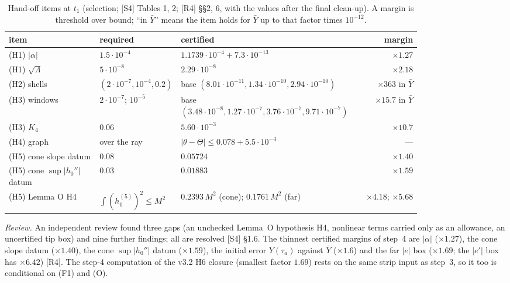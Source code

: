 \documentclass[11pt]{amsart}
\theoremstyle{definition}
\theoremstyle{remark}
\newcommand{\Lam}{\Lambda}
\newcommand{\dref}[1]{[\textsf{#1}]}
\begin{document}
\begin{table}[htbp]\centering\small
\caption{Hand-off items at $t_1$ (selection; \dref{S4} Tables 1, 2; \dref{R4} \S\S2, 6, with the values after the final clean-up). A margin is threshold over bound; ``in $\bar Y$'' means the item holds for $\bar Y$ up to that factor times $10^{-12}$.}\label{tab:handoff}
\footnotesize
\begin{tabular}{@{}p{0.22\linewidth}p{0.19\linewidth}p{0.41\linewidth}r@{}}\toprule
item & required & certified & margin\\\midrule
(H1) $|\alpha|$ & $1.5\cdot10^{-4}$ & $1.1739\cdot10^{-4}+7.3\cdot10^{-13}$ & $\times1.27$\\
(H1) $\sqrt\Lam$ & $5\cdot10^{-8}$ & $2.29\cdot10^{-8}$ & $\times2.18$\\
(H2) shells & $(2\cdot10^{-7},10^{-4},0.2)$ & base $(8.01\cdot10^{-11},1.34\cdot10^{-10},2.94\cdot10^{-10})$ & $\times363$ in $\bar Y$\\
(H3) windows & $2\cdot10^{-7}$; $10^{-5}$ & base $(3.48\cdot10^{-8},1.27\cdot10^{-7},3.76\cdot10^{-7},9.71\cdot10^{-7})$ & $\times15.7$ in $\bar Y$\\
(H3) $K_4$ & $0.06$ & $5.60\cdot10^{-3}$ & $\times10.7$\\
(H4) graph & over the ray & $|\theta-\Theta|\le0.078+5.5\cdot10^{-4}$ & ---\\
(H5) cone slope datum & $0.08$ & $0.05724$ & $\times1.40$\\
(H5) cone $\sup|h_0''|$ datum & $0.03$ & $0.01883$ & $\times1.59$\\
(H5) Lemma O H4 & $\int(h_0^{(5)})^2\le M^2$ & $0.2393\,M^2$ (cone); $0.1761\,M^2$ (far) & $\times4.18$; $\times5.68$\\\bottomrule
\end{tabular}\end{table}

\emph{Review.} An independent review found three gaps (an unchecked Lemma~O hypothesis H4, nonlinear terms carried only as an allowance, an uncertified tip box) and nine further findings; all are resolved \dref{S4} \S1.6. The thinnest certified margins of step~4 are $|\alpha|$ ($\times1.27$), the cone slope datum ($\times1.40$), the cone $\sup|h_0''|$ datum ($\times1.59$), the initial error $Y(\tau_a)$ against $\bar Y$ ($\times1.6$) and the far $|e|$ box ($\times1.69$; the $|e'|$ box has $\times6.42$) \dref{R4}. The step-4 computation of the v3.2 H6 closure (smallest factor $1.69$) rests on the same strip input as step~3, so it too is conditional on (F1) and (O).
\end{document}
